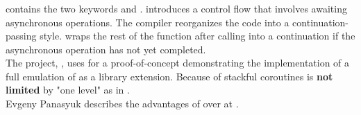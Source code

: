 \subsubsection*{\csharp \await}
\csharp contains the two keywords \async and \await. \async introduces a
control flow that involves awaiting asynchronous operations. The compiler
reorganizes the code into a continuation-passing style. \await wraps the rest
of the function after calling \await into a continuation if the asynchronous
operation has not yet completed.\\
The project, \awaitemu, uses \boostcoroutine for a proof-of-concept
demonstrating the implementation of a full emulation of \csharp \await as a
library extension. Because of stackful coroutines \await is \textbf{not limited}
by "one level" as in \csharp.\\
Evgeny Panasyuk describes the advantages of \boostcoroutine over \await at
\channelnine.
